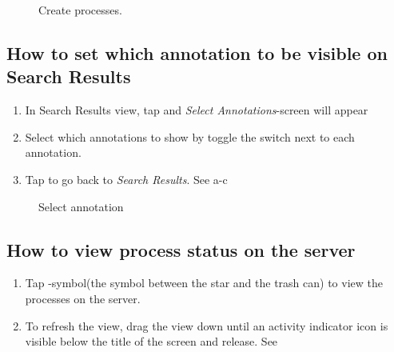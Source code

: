 \begin{figure}[htb]
\caption{Create processes.}
\label{fig:ios_make_process_view}
\end{figure}
\FloatBarrier


\subsection{How to set which annotation to be visible on Search Results}

\begin{enumerate}
\item In Search Results view, tap  and \emph{Select Annotations}-screen will appear
\item Select which annotations to show by toggle the switch next to each annotation.
\item Tap  to go back to \emph{Search Results}. See a-c
\end{enumerate}

\begin{figure}[ht]
\caption{Select annotation}
\label{fig:ios_searchResult}
\end{figure}
\FloatBarrier


\subsection{How to view process status on the server}

\begin{enumerate}
\item Tap -symbol(the symbol between the star and the trash can) to view the processes on the server.
\item To refresh the view, drag the view down until an activity indicator icon is visible below the title of the screen and release. See 
\end{enumerate}


